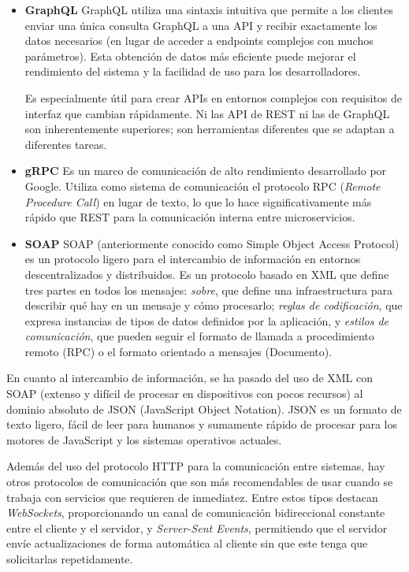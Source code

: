 \begin{itemize}
    \item \textbf{GraphQL} \cite{graphql}
    \newline
    GraphQL utiliza una sintaxis intuitiva que permite a los clientes enviar una única consulta GraphQL a una API y 
    recibir exactamente los datos necesarios (en lugar de acceder a endpoints complejos con muchos parámetros). 
    Esta obtención de datos más eficiente puede mejorar el rendimiento del sistema y la facilidad de uso para los 
    desarrolladores. 

    Es especialmente útil para crear APIs en entornos complejos con requisitos de interfaz que cambian rápidamente. Ni 
    las API de REST ni las de GraphQL son inherentemente superiores; son herramientas diferentes que se adaptan a 
    diferentes tareas.

    \item \textbf{gRPC} \cite{grpc}
    \newline
    Es un marco de comunicación de alto rendimiento desarrollado por Google. Utiliza como sistema de comunicación
    el protocolo RPC (\textit{Remote Procedure Call}) en lugar de texto, lo que lo hace significativamente más rápido 
    que REST para la comunicación interna entre microservicios.

    \item \textbf{SOAP} \cite{soap}
    \newline
    SOAP (anteriormente conocido como Simple Object Access Protocol) es un protocolo ligero para el intercambio de 
    información en entornos descentralizados y distribuidos. Es un protocolo basado en XML que define tres partes 
    en todos los mensajes: \textit{sobre}, que define una infraestructura para describir qué hay en un mensaje y 
    cómo procesarlo; \textit{reglas de codificación}, que expresa instancias de tipos de datos definidos por la 
    aplicación, y \textit{estilos de comunicación}, que pueden seguir el formato de llamada a procedimiento remoto 
    (RPC) o el formato orientado a mensajes (Documento). 
\end{itemize}

En cuanto al intercambio de información, se ha pasado del uso de XML con SOAP (extenso y difícil de procesar en 
dispositivos con pocos recursos) al dominio absoluto de JSON (JavaScript Object Notation). JSON es un formato 
de texto ligero, fácil de leer para humanos y sumamente rápido de procesar para los motores de JavaScript y 
los sistemas operativos actuales.

Además del uso del protocolo HTTP para la comunicación entre sistemas, hay otros protocolos de comunicación que son
más recomendables de usar cuando se trabaja con servicios que requieren de inmediatez. Entre estos tipos destacan 
\textit{WebSockets}, proporcionando un canal de comunicación bidireccional constante entre el cliente y el servidor,
y \textit{Server-Sent Events}, permitiendo que el servidor envíe actualizaciones de forma automática al cliente sin 
que este tenga que solicitarlas repetidamente.

